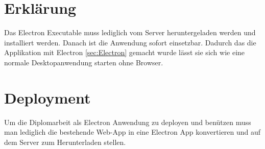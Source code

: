 \section*{Erklärung}
Das Electron Executable muss lediglich vom Server heruntergeladen werden und installiert werden. Danach ist die Anwendung sofort einsetzbar. Dadurch das die Applikation mit Electron \ref{sec:Electron} gemacht wurde lässt sie sich wie eine normale Desktopanwendung starten ohne Browser.

\section*{Deployment}
Um die Diplomarbeit als Electron Anwendung zu deployen und benützen muss man lediglich die bestehende Web-App in eine Electron App konvertieren und auf dem Server zum Herunterladen stellen.
